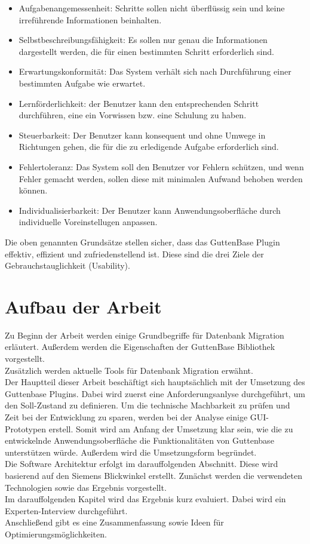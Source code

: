 \begin{itemize}
	\item Aufgabenangemessenheit:
	Schritte sollen nicht überflüssig sein und keine irreführende Informationen beinhalten.
	
	\item Selbstbeschreibungsfähigkeit:
	Es sollen nur genau die Informationen dargestellt werden, die für einen bestimmten Schritt erforderlich sind.
	
	\item Erwartungskonformität:
	Das System verhält sich nach Durchführung einer bestimmten Aufgabe wie erwartet.
	
	\item Lernförderlichkeit:
	der Benutzer kann den entsprechenden Schritt durchführen, eine ein Vorwissen bzw. eine Schulung zu haben.
	
	\item Steuerbarkeit:
	Der Benutzer kann konsequent und ohne Umwege in Richtungen gehen, die für die zu erledigende Aufgabe erforderlich sind.
	
	\item Fehlertoleranz:
	Das System soll den Benutzer vor Fehlern schützen, und wenn Fehler gemacht werden, sollen diese mit minimalen Aufwand behoben werden können.

	\item Individualisierbarkeit:
	Der Benutzer kann Anwendungsoberfläche durch individuelle Voreinstellugen anpassen.
	
\end{itemize}
Die oben genannten Grundsätze stellen sicher, dass das GuttenBase Plugin effektiv, effizient und zufriedenstellend ist. Diese sind die drei Ziele der Gebrauchstauglichkeit (Usability).

\section{Aufbau der Arbeit}
Zu Beginn der Arbeit werden einige Grundbegriffe für Datenbank Migration erläutert. Außerdem werden die Eigenschaften der GuttenBase Bibliothek vorgestellt.\\
Zusätzlich werden aktuelle Tools für Datenbank Migration erwähnt.\\
Der Hauptteil dieser Arbeit beschäftigt sich hauptsächlich mit der Umsetzung des Guttenbase Plugins. Dabei wird zuerst eine Anforderungsanlyse durchgeführt, um den Soll-Zustand zu definieren. Um die technische Machbarkeit zu prüfen und Zeit bei der Entwicklung zu sparen, werden bei der Analyse einige GUI-Prototypen erstell. Somit wird am Anfang der Umsetzung klar sein, wie die zu entwickelnde Anwendungsoberfläche die Funktionalitäten von Guttenbase unterstützen würde. Außerdem wird die Umsetzungsform begründet. \\
Die Software Architektur erfolgt im darauffolgenden Abschnitt. Diese wird basierend auf den Siemens Blickwinkel erstellt. Zunächst werden die verwendeten Technologien sowie das Ergebnis vorgestellt.\\
Im darauffolgenden Kapitel wird das Ergebnis kurz evaluiert. Dabei wird ein Experten-Interview durchgeführt.\\
Anschließend gibt es eine Zusammenfassung sowie Ideen für Optimierungsmöglichkeiten.